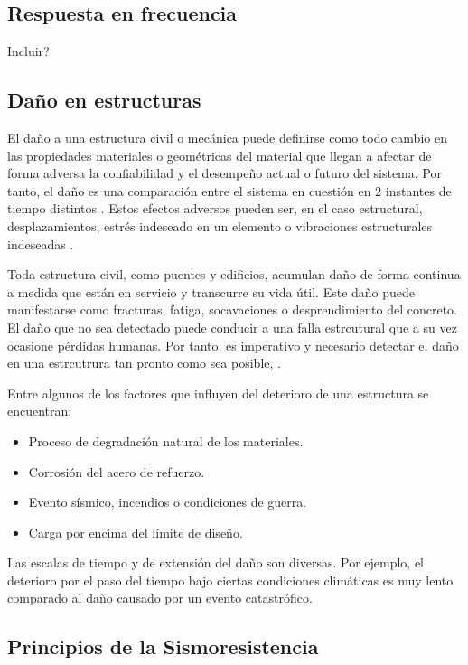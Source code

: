 \subsection{Respuesta en frecuencia}

    Incluir?

\subsection{Daño en estructuras}

El daño a una estructura civil o mecánica puede definirse como todo cambio en las propiedades materiales o geométricas del material que llegan a afectar de forma adversa la confiabilidad y el desempeño actual o futuro del sistema. Por tanto, el daño es una comparación entre el sistema en cuestión en 2 instantes de tiempo distintos \citep{farrar2007introduction}. Estos efectos adversos pueden ser, en el caso estructural, desplazamientos, estrés indeseado en un elemento o vibraciones estructurales indeseadas \citep{chen2018}.

Toda estructura civil, como puentes y edificios, acumulan daño de forma continua a medida que están en servicio y transcurre su vida útil. Este daño puede manifestarse como fracturas, fatiga, socavaciones o desprendimiento del concreto. El daño que no sea detectado puede conducir a una falla estrcutural que a su vez ocasione pérdidas humanas. Por tanto, es imperativo y necesario detectar el daño en una estrcutrura tan pronto como sea posible, \citep{chen2018}.

Entre algunos de los factores que influyen del deterioro de una estructura se encuentran:
    
        \begin{itemize}
            \item Proceso de degradación natural de los materiales.
            \item Corrosión del acero de refuerzo.
            \item Evento sísmico, incendios o condiciones de guerra.
            \item Carga por encima del límite de diseño.
        \end{itemize}
    
Las escalas de tiempo y de extensión del daño son diversas. Por ejemplo, el deterioro por el paso del tiempo bajo ciertas condiciones climáticas es muy lento comparado al daño causado por un evento catastrófico.

\subsection{Principios de la Sismoresistencia}

